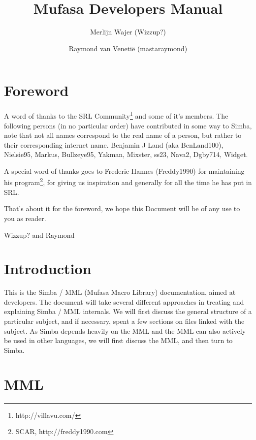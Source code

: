 \documentclass[a4paper, 10pt]{report} %
\begin{document}
\title{Mufasa Developers Manual}
\author{Merlijn Wajer (Wizzup?) \and Raymond van Veneti\"{e} (mastaraymond)}
\maketitle
\tableofcontents
\lstset{language=Pascal}


\chapter{Foreword}

A word of thanks to the SRL Community\footnote{http://villavu.com/} and some of
it's members.
The following persons (in no particular order) have contributed in some way to
Simba, note that not all names correspond to the real name of a person, but
rather to their corresponding internet name.
Benjamin J Land (aka BenLand100), Nielsie95, Markus, Bullzeye95,
Yakman, Mixster, ss23, Nava2, Dgby714, Widget.

A special word of thanks goes to Frederic Hannes (Freddy1990) for maintaining
his program\footnote{SCAR, http://freddy1990.com}, for giving us inspiration
and generally for all the time he has put in SRL.

That's about it for the foreword, we hope this Document will be of any use to
you as reader.

Wizzup? and Raymond

\chapter{Introduction}

This is the Simba / MML (Mufasa Macro Library) documentation, aimed at
developers. The document will take several different approaches in treating and
explaining Simba / MML internals. We will first discuss the general 
structure of a particular subject, and if necessary, spent a few sections
on files linked with the subject. 
As Simba depends heavily on the MML and the MML can also actively be used in 
other languages, we will first discuss the MML, and then turn to Simba.

\chapter{MML}
\end{document}
